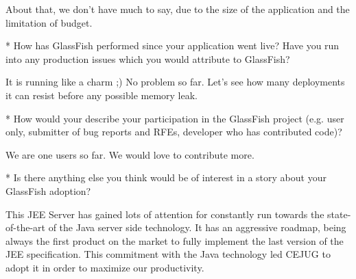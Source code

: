 \documentclass[10pt,a4paper]{report}
\begin{document}
About that, we don't have much to say, due to the size of the application and the limitation of budget.  

* How has GlassFish performed since your application went live?  Have you run
  into any production issues which you would attribute to GlassFish?
  
It is running like a charm ;) No problem so far. Let's see how many deployments it can resist before any possible memory leak.  

* How would your describe your participation in the GlassFish project (e.g.
  user only, submitter of bug reports and RFEs, developer who has contributed
  code)?
  
  We are one users so far. We would love to contribute more.

* Is there anything else you think would be of interest in a story about your
  GlassFish adoption? 
  
This JEE Server has gained lots of attention for constantly run towards the state-of-the-art of the Java server side technology. It has an aggressive roadmap, being always the first product on the market to fully implement the last version of the JEE specification. This commitment with the Java technology led CEJUG to adopt it in order to maximize our productivity.
  
\end{document}

